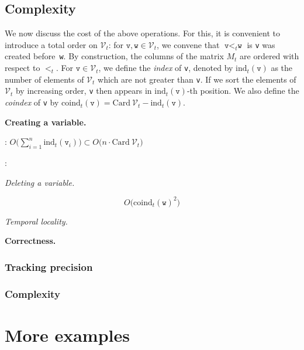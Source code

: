 \documentclass[sigconf]{acmart}
\newcommand{\calV}{\mathcal{V}}
\newcommand{\ttv}{\texttt{v}\xspace}
\newcommand{\ttw}{\texttt{w}\xspace}
\newcommand{\ZpLC}{\text{\rm \tt ZpLC}\xspace}
\newcommand{\ZpLF}{\text{\rm \tt ZpLF}\xspace}
\newcommand{\card}{\text{Card}\:}
\newcommand{\ind}{\text{ind}}
\newcommand{\coind}{\text{coind}}
\theoremstyle{definition}
\begin{document}
\subsection{Complexity}

We now discuss the cost of the above operations.
For this,
it is convenient to introduce a total order on $\calV_t$: for $\ttv, 
\ttw \in \calV_t$, we convene that $\ttv <_t \ttw$ is \ttv was created 
before~\ttw. By construction, the columns of the matrix $M_t$ are 
ordered with respect to $<_t$.
For $\ttv \in \calV_t$, we define the \emph{index} of \ttv, denoted by 
$\ind_t(\ttv)$ as the number of elements of $\calV_t$ which are not 
greater than \ttv. If we sort the elements of $\calV_t$ by increasing 
order, \ttv then appears in $\ind_t(\ttv)$-th position.
We also define the \emph{coindex} of \ttv by
$\coind_t(\ttv) = \card \calV_t - \ind_t(\ttv)$.

\medskip

\noindent \textbf{Creating a variable.}

\ZpLC: $O\bigg(\sum_{i=1}^n \ind_t(\ttv_i)\bigg) \subset 
O\big(n \cdot \card \calV_t\big)$

\ZpLF: 

\medskip

\noindent \textit{Deleting a variable.}

$$O\big(\coind_t(\ttw)^2\big)$$

\medskip

\noindent \textit{Temporal locality.}

\medskip

\noindent \textbf{Correctness.}

\subsubsection*{Tracking precision}

\subsubsection*{Complexity}

\section{More examples}
\end{document}
